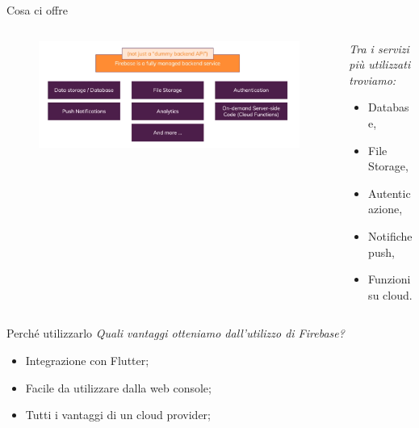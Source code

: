 \documentclass{../libs/presentation_format}
\begin{document}
\begin{frame}{Cosa ci offre}
	\begin{minipage}[0.2\textheight]{\textwidth}
		\begin{columns}[T]
			\begin{column}{0.4\textwidth}
				\begin{figure}[htpb]
					\centering
					\includegraphics[scale=0.12]{../libs/what-firebase}
				\end{figure}
			\end{column}
			\begin{column}{0.6\textwidth}
				\emph{Tra i servizi più utilizzati troviamo:}
				\begin{itemize}
					\item Database,
					\item File Storage,
					\item Autenticazione,
					\item Notifiche push,
					\item Funzioni su cloud.
				\end{itemize}
			\end{column}
		\end{columns}
	\end{minipage}
\end{frame}


\begin{frame}{Perché utilizzarlo}
	\emph{Quali vantaggi otteniamo dall'utilizzo di Firebase?}
	\begin{itemize}
		\item Integrazione con Flutter;
		\item Facile da utilizzare dalla web console;
		\item Tutti i vantaggi di un cloud provider;
	\end{itemize}
\end{frame}
\end{document}
